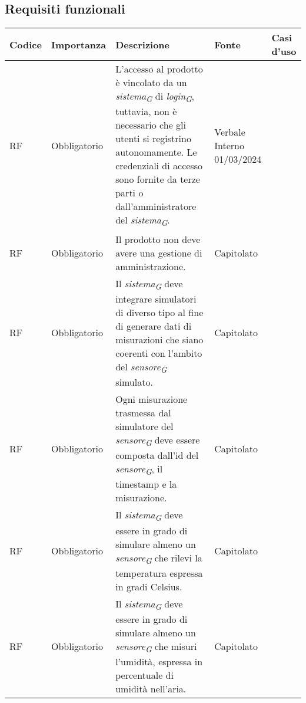 \subsection{Requisiti funzionali}

\begin{longtable}{|C{1.5cm}|C{2cm}|L{5cm}|C{2cm}|C{1.5cm}|}
    \hline
    \textbf{Codice} & \textbf{Importanza} & \textbf{Descrizione} & \textbf{Fonte}  & \textbf{Casi d'uso} \\
    
    \hline
    RF & Obbligatorio &
    L'accesso al prodotto è vincolato da un \textit{sistema}\textsubscript{\textit{G}} di \textit{login}\textsubscript{\textit{G}}, tuttavia, non è necessario che gli utenti si registrino autonomamente. Le credenziali di accesso sono fornite da terze parti o dall'amministratore del \textit{sistema}\textsubscript{\textit{G}}.& Verbale Interno 01/03/2024 & \\
    
    \hline
     RF & Obbligatorio & Il prodotto non deve avere una gestione di amministrazione.& Capitolato & \\
    
    \hline
     RF & Obbligatorio & Il \textit{sistema}\textsubscript{\textit{G}} deve integrare simulatori di diverso tipo al fine di generare dati di misurazioni che siano coerenti con l'ambito del \textit{sensore}\textsubscript{\textit{G}} simulato.& Capitolato & \\
    
    \hline
     RF & Obbligatorio & Ogni misurazione trasmessa dal simulatore del \textit{sensore}\textsubscript{\textit{G}} deve essere composta dall'id del \textit{sensore}\textsubscript{\textit{G}}, il timestamp e la misurazione.& Capitolato & \\
    
    \hline
     RF & Obbligatorio &  Il \textit{sistema}\textsubscript{\textit{G}} deve essere in grado di simulare almeno un \textit{sensore}\textsubscript{\textit{G}} che rilevi la temperatura espressa in gradi Celsius.& Capitolato &  \\
    
    \hline
     RF & Obbligatorio &  Il \textit{sistema}\textsubscript{\textit{G}} deve essere in grado di simulare almeno un \textit{sensore}\textsubscript{\textit{G}} che misuri l'umidità, espressa in percentuale di umidità nell'aria.& Capitolato &  \\
    

\end{longtable}
